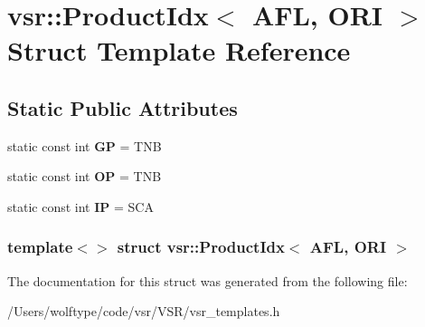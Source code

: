 \hypertarget{structvsr_1_1_product_idx_3_01_a_f_l_00_01_o_r_i_01_4}{\section{vsr\-:\-:Product\-Idx$<$ A\-F\-L, O\-R\-I $>$ Struct Template Reference}
\label{structvsr_1_1_product_idx_3_01_a_f_l_00_01_o_r_i_01_4}
}
\subsection*{Static Public Attributes}
\begin{DoxyCompactItemize}
\item 
\hypertarget{structvsr_1_1_product_idx_3_01_a_f_l_00_01_o_r_i_01_4_ac9b2aa20739c2fb3edf2a4b117253f8e}{static const int {\bfseries G\-P} = T\-N\-B}\label{structvsr_1_1_product_idx_3_01_a_f_l_00_01_o_r_i_01_4_ac9b2aa20739c2fb3edf2a4b117253f8e}

\item 
\hypertarget{structvsr_1_1_product_idx_3_01_a_f_l_00_01_o_r_i_01_4_a6e10fecf0076e9ecade656b40b27de91}{static const int {\bfseries O\-P} = T\-N\-B}\label{structvsr_1_1_product_idx_3_01_a_f_l_00_01_o_r_i_01_4_a6e10fecf0076e9ecade656b40b27de91}

\item 
\hypertarget{structvsr_1_1_product_idx_3_01_a_f_l_00_01_o_r_i_01_4_a3fb0b6647defa2ea038619ee10b0a723}{static const int {\bfseries I\-P} = S\-C\-A}\label{structvsr_1_1_product_idx_3_01_a_f_l_00_01_o_r_i_01_4_a3fb0b6647defa2ea038619ee10b0a723}

\end{DoxyCompactItemize}
\subsubsection*{template$<$$>$ struct vsr\-::\-Product\-Idx$<$ A\-F\-L, O\-R\-I $>$}



The documentation for this struct was generated from the following file\-:\begin{DoxyCompactItemize}
\item 
/\-Users/wolftype/code/vsr/\-V\-S\-R/vsr\-\_\-templates.\-h\end{DoxyCompactItemize}
